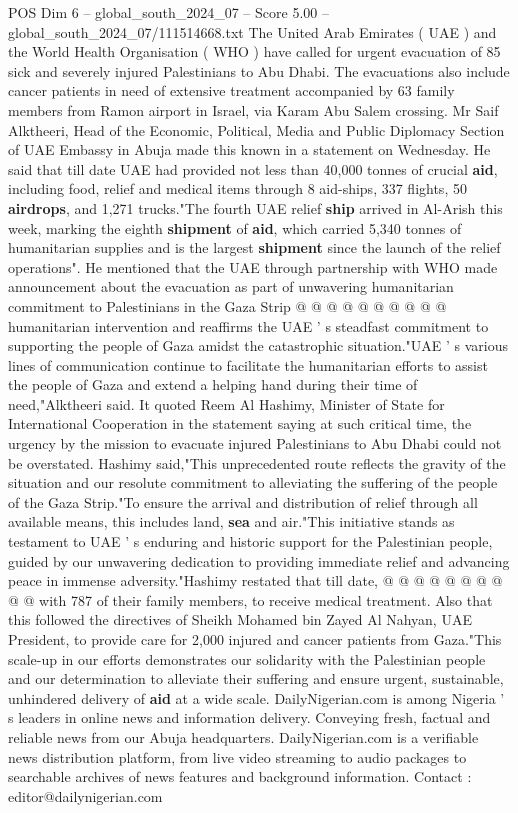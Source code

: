 \begin{textsample}{POS Dim 6 – global\_south\_2024\_07 – Score 5.00 – global\_south\_2024\_07/111514668.txt}  \label{ex:f6_pos_319}
The United Arab Emirates ( UAE ) and the World Health Organisation ( WHO ) have called for urgent evacuation of 85 sick and severely injured Palestinians to Abu Dhabi.
The evacuations also include cancer patients in need of extensive treatment accompanied by 63 family members from Ramon airport in Israel, via Karam Abu Salem crossing.
Mr Saif Alktheeri, Head of the Economic, Political, Media and Public Diplomacy Section of UAE Embassy in Abuja made this known in a statement on Wednesday.
He said that till date UAE had provided not less than 40,000 tonnes of crucial \textbf{aid}, including food, relief and medical items through 8 aid-ships, 337 flights, 50 \textbf{airdrops}, and 1,271 trucks."The fourth UAE relief \textbf{ship} arrived in Al-Arish this week, marking the eighth \textbf{shipment} of \textbf{aid}, which carried 5,340 tonnes of humanitarian supplies and is the largest \textbf{shipment} since the launch of the relief operations".
He mentioned that the UAE through partnership with WHO made announcement about the evacuation as part of unwavering humanitarian commitment to Palestinians in the Gaza Strip @ @ @ @ @ @ @ @ @ @ humanitarian intervention and reaffirms the UAE ' s steadfast commitment to supporting the people of Gaza amidst the catastrophic situation."UAE ' s various lines of communication continue to facilitate the humanitarian efforts to assist the people of Gaza and extend a helping hand during their time of need,"Alktheeri said.
It quoted Reem Al Hashimy, Minister of State for International Cooperation in the statement saying at such critical time, the urgency by the mission to evacuate injured Palestinians to Abu Dhabi could not be overstated.
Hashimy said,"This unprecedented route reflects the gravity of the situation and our resolute commitment to alleviating the suffering of the people of the Gaza Strip."To ensure the arrival and distribution of relief through all available means, this includes land, \textbf{sea} and air."This initiative stands as testament to UAE ' s enduring and historic support for the Palestinian people, guided by our unwavering dedication to providing immediate relief and advancing peace in immense adversity."Hashimy restated that till date, @ @ @ @ @ @ @ @ @ @ with 787 of their family members, to receive medical treatment.
Also that this followed the directives of Sheikh Mohamed bin Zayed Al Nahyan, UAE President, to provide care for 2,000 injured and cancer patients from Gaza."This scale-up in our efforts demonstrates our solidarity with the Palestinian people and our determination to alleviate their suffering and ensure urgent, sustainable, unhindered delivery of \textbf{aid} at a wide scale.
DailyNigerian.com is among Nigeria ' s leaders in online news and information delivery.
Conveying fresh, factual and reliable news from our Abuja headquarters.
DailyNigerian.com is a verifiable news distribution platform, from live video streaming to audio packages to searchable archives of news features and background information.
Contact : editor@dailynigerian.com

\end{textsample}
